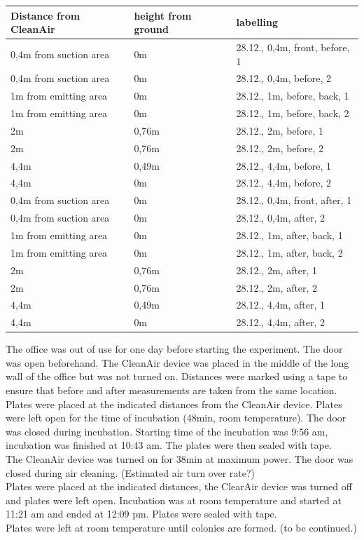 \documentclass[hyperref]{labbook}
\begin{document}
\begin{table}[h!]
\begin{tabular}{|lll|}\hline
Distance from CleanAir  & height from ground & labelling\\\hline
0,4m from suction area & 0m & 28.12., 0,4m, front, before, 1 \\
0,4m from suction area & 0m & 28.12., 0,4m, before, 2 \\
1m from emitting area & 0m & 28.12., 1m, before, back, 1\\
1m from emitting area & 0m & 28.12., 1m, before, back, 2\\
2m & 0,76m & 28.12., 2m, before, 1\\
2m & 0,76m & 28.12., 2m, before, 2\\
4,4m & 0,49m & 28.12., 4,4m, before, 1\\
4,4m & 0m & 28.12., 4,4m, before, 2\\\hline
0,4m from suction area & 0m & 28.12., 0,4m, front, after, 1 \\
0,4m from suction area & 0m & 28.12., 0,4m, after, 2 \\
1m from emitting area & 0m & 28.12., 1m, after, back, 1\\
1m from emitting area & 0m & 28.12., 1m, after, back, 2\\
2m & 0,76m & 28.12., 2m, after, 1\\
2m & 0,76m & 28.12., 2m, after, 2\\
4,4m & 0,49m & 28.12., 4,4m, after, 1\\
4,4m & 0m & 28.12., 4,4m, after, 2\\\hline
\end{tabular}
\end{table}

The office was out of use for one day before starting the experiment. The door was open beforehand. The CleanAir device was placed in the middle of the long wall of the office but was not turned on. Distances were marked using a tape to ensure that before and after measurements are taken from the same location. Plates were placed at the indicated distances from the CleanAir device. Plates were left open for the time of incubation (48min, room temperature). The door was closed during incubation. Starting time of the incubation was 9:56 am, incubation was finished at 10:43 am. The plates were then sealed with tape.\\
The CleanAir device was turned on for 38min at maximum power. The door was closed during air cleaning. (Estimated air turn over rate?)\\
Plates were placed at the indicated distances, the ClearAir device was turned off and plates were left open. Incubation was at room temperature and started at 11:21 am and ended at 12:09 pm. Plates were sealed with tape.\\
Plates were left at room temperature until colonies are formed. (to be continued.)
\end{document}
